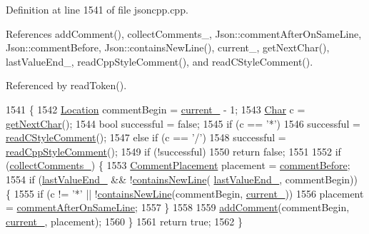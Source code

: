 Definition at line 1541 of file jsoncpp.\+cpp.



References add\+Comment(), collect\+Comments\+\_\+, Json\+::comment\+After\+On\+Same\+Line, Json\+::comment\+Before, Json\+::contains\+New\+Line(), current\+\_\+, get\+Next\+Char(), last\+Value\+End\+\_\+, read\+Cpp\+Style\+Comment(), and read\+C\+Style\+Comment().



Referenced by read\+Token().


\begin{DoxyCode}
1541                             \{
1542   \hyperlink{class_json_1_1_our_reader_a1bdc7bbc52ba87cae6b19746f2ee0189}{Location} commentBegin = \hyperlink{class_json_1_1_our_reader_a5211fbbba94be80a22dd2317c621efcc}{current\_} - 1;
1543   \hyperlink{class_json_1_1_our_reader_a0cd0bab4caa66594ab843ccd5f9dc239}{Char} c = \hyperlink{class_json_1_1_our_reader_a298285d035fdbc554caae09d9f0a5859}{getNextChar}();
1544   \textcolor{keywordtype}{bool} successful = \textcolor{keyword}{false};
1545   \textcolor{keywordflow}{if} (c == \textcolor{charliteral}{'*'})
1546     successful = \hyperlink{class_json_1_1_our_reader_aba784b125baa1b62387e767b791f2f89}{readCStyleComment}();
1547   \textcolor{keywordflow}{else} \textcolor{keywordflow}{if} (c == \textcolor{charliteral}{'/'})
1548     successful = \hyperlink{class_json_1_1_our_reader_ae3de80671f0f997053e1c1c8a47a45c5}{readCppStyleComment}();
1549   \textcolor{keywordflow}{if} (!successful)
1550     \textcolor{keywordflow}{return} \textcolor{keyword}{false};
1551 
1552   \textcolor{keywordflow}{if} (\hyperlink{class_json_1_1_our_reader_a259f6ac988da2894bcafc670e42f73ad}{collectComments\_}) \{
1553     \hyperlink{namespace_json_a4fc417c23905b2ae9e2c47d197a45351}{CommentPlacement} placement = \hyperlink{namespace_json_a4fc417c23905b2ae9e2c47d197a45351a52f1733775460517b2ea6bedf4906d52}{commentBefore};
1554     \textcolor{keywordflow}{if} (\hyperlink{class_json_1_1_our_reader_a101eadc45e01c60628b53f0db3d13482}{lastValueEnd\_} && !\hyperlink{namespace_json_a4d6ab0f651348832e5cc49b577a854d2}{containsNewLine}(
      \hyperlink{class_json_1_1_our_reader_a101eadc45e01c60628b53f0db3d13482}{lastValueEnd\_}, commentBegin)) \{
1555       \textcolor{keywordflow}{if} (c != \textcolor{charliteral}{'*'} || !\hyperlink{namespace_json_a4d6ab0f651348832e5cc49b577a854d2}{containsNewLine}(commentBegin, \hyperlink{class_json_1_1_our_reader_a5211fbbba94be80a22dd2317c621efcc}{current\_}))
1556         placement = \hyperlink{namespace_json_a4fc417c23905b2ae9e2c47d197a45351a008a230a0586de54f30b76afe70fdcfa}{commentAfterOnSameLine};
1557     \}
1558 
1559     \hyperlink{class_json_1_1_our_reader_ad7318c37469a9106069a236fb4b10e1f}{addComment}(commentBegin, \hyperlink{class_json_1_1_our_reader_a5211fbbba94be80a22dd2317c621efcc}{current\_}, placement);
1560   \}
1561   \textcolor{keywordflow}{return} \textcolor{keyword}{true};
1562 \}
\end{DoxyCode}
